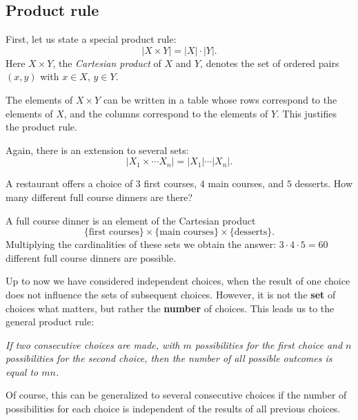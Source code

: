 \begin{page}
\setcounter{section}{1}
\setcounter{subsection}{2}
\setcounter{dfn}{0}
\label{portion:8}

\subsection{Product rule}
First, let us state a special product rule:
\[
|X \times Y| = |X| \cdot |Y|.
\]
Here $X \times Y$, the \emph{Cartesian product} of $X$ and $Y$, denotes the set of ordered pairs $(x,y)$ with $x \in X$, $y \in Y$.

The elements of $X \times Y$ can be written in a table whose rows correspond to the elements of $X$,
and the columns correspond to the elements of $Y$.
This justifies the product rule.

Again, there is an extension to several sets:
\[
|X_1 \times \cdots X_n| = |X_1| \cdots |X_n|.
\]


\end{page}

\begin{page}
\setcounter{section}{1}
\setcounter{subsection}{2}
\setcounter{dfn}{1}
\label{portion:10}

\begin{exl}
A restaurant offers a choice of $3$ first courses, $4$ main courses, and $5$ desserts.
How many different full course dinners are there?

A full course dinner is an element of the Cartesian product
\[
\{\text{first courses}\} \times \{\text{main courses}\} \times \{\text{desserts}\}.
\]
Multiplying the cardinalities of these sets we obtain the answer: $3 \cdot 4 \cdot 5 = 60$ different full course dinners are possible.
\end{exl}

\end{page}

\begin{page}
\setcounter{section}{1}
\setcounter{subsection}{2}
\setcounter{dfn}{1}
\label{portion:11}


Up to now we have considered independent choices,
when the result of one choice does not influence the sets of subsequent choices.
However, it is not the \textbf{set} of choices what matters, but rather the \textbf{number} of choices.
This leads us to the general product rule:
\begin{center}
\parbox{.9\textwidth}{\emph{If two consecutive choices are made, with $m$ possibilities for the first choice and $n$ possibilities for the second choice,
then the number of all possible outcomes is equal to $mn$.}}
\end{center}
Of course, this can be generalized to several consecutive choices
if the number of possibilities for each choice is independent of the results of all previous choices.


\end{page}


